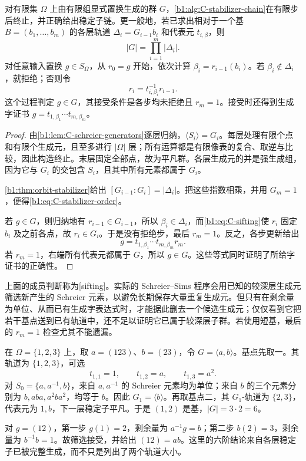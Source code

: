 \begin{proposition}\label{b1:prop:C-stabilizer-computation}
	对有限集 \(\Omega\) 上由有限组显式置换生成的群 \(G\)，\cref{b1:alg:C-stabilizer-chain}在有限步后终止，并正确给出稳定子链。更一般地，若已求出相对于一个基 \(B=(b_1,\ldots,b_m)\) 的各层轨道 \(\Delta_i=G_{i-1}b_i\) 和代表元 \(t_{i,\beta}\)，则
	\begin{equation}\label{b1:eq:C-stabilizer-order}
		|G|=\prod_{i=1}^m|\Delta_i|.
	\end{equation}
	对任意输入置换 \(g\in S_\Omega\)，从 \(r_0=g\) 开始，依次计算 \(\beta_i=r_{i-1}(b_i)\)。若 \(\beta_i\notin\Delta_i\)，就拒绝；否则令
	\begin{equation}\label{b1:eq:C-sifting}
		r_i=t_{i,\beta_i}^{-1}r_{i-1}.
	\end{equation}
	这个过程判定 \(g\in G\)，其接受条件是各步均未拒绝且 \(r_m=1\)。接受时还得到生成字证书 \(g=t_{1,\beta_1}\cdots t_{m,\beta_m}\)。
\end{proposition}

\begin{proof}
	由\cref{b1:lem:C-schreier-generators}逐层归纳，\(\langle S_i\rangle=G_i\)。每层处理有限个点和有限个生成元，且至多进行 \(|\Omega|\) 层；所有运算都是有限像表的复合、取逆与比较，因此构造终止。末层固定全部点，故为平凡群。各层生成元的并是强生成组，因为它与 \(G_i\) 的交包含 \(S_i\)，且其中所有元素都属于 \(G_i\)。

	\cref{b1:thm:orbit-stabilizer}给出 \([G_{i-1}:G_i]=|\Delta_i|\)。把这些指数相乘，并用 \(G_m=1\)，便得\eqref{b1:eq:C-stabilizer-order}。

	若 \(g\in G\)，则归纳地有 \(r_{i-1}\in G_{i-1}\)，所以 \(\beta_i\in\Delta_i\)，而\eqref{b1:eq:C-sifting}使 \(r_i\) 固定 \(b_i\) 及之前各点，故 \(r_i\in G_i\)。于是没有拒绝步，最后 \(r_m=1\)。反之，各步更新给出
	\[
		g=t_{1,\beta_1}\cdots t_{m,\beta_m}r_m.
	\]
	若 \(r_m=1\)，右端所有代表元都属于 \(G\)，所以 \(g\in G\)。这些等式同时证明了所给字证书的正确性。
\end{proof}

上面的成员判断称为[sifting]。实际的 Schreier--Sims 程序会用已知的较深层生成元筛选新产生的 Schreier 元素，以避免长期保存大量重复生成元。但只有在剩余量为单位、从而已有生成字表达式时，才能据此删去一个候选生成元；仅仅看到它把若干基点送到已有轨道中，还不足以证明它已属于较深层子群。若使用短基，最后的 \(r_m=1\) 检查尤其不能遗漏。

\begin{example}\label{b1:exm:C-s3-chain}
	在 \(\Omega=\{1,2,3\}\) 上，取 \(a=(123)\)、\(b=(23)\)，令 \(G=\langle a,b\rangle\)。基点先取一。其轨道为 \(\{1,2,3\}\)，可选
	\[
		t_{1,1}=1,\qquad t_{1,2}=a,\qquad t_{1,3}=a^2.
	\]
	对 \(S_0=\{a,a^{-1},b\}\)，来自 \(a,a^{-1}\) 的 Schreier 元素均为单位；来自 \(b\) 的三个元素分别为 \(b,aba,a^2ba^2\)，均等于 \(b\)。因此 \(G_1=\langle b\rangle\)。再取基点二，其 \(G_1\)-轨道为 \(\{2,3\}\)，代表元为 \(1,b\)，下一层稳定子平凡。于是 \((1,2)\) 是基，\(|G|=3\cdot2=6\)。

	\ProseParagraphBreak
	对 \(g=(12)\)，第一步 \(g(1)=2\)，剩余量为 \(a^{-1}g=b\)；第二步 \(b(2)=3\)，剩余量为 \(b^{-1}b=1\)。故筛选接受，并给出 \((12)=ab\)。这里的六阶结论来自各层稳定子已被完整生成，而不只是列出了两个轨道大小。
\end{example}

